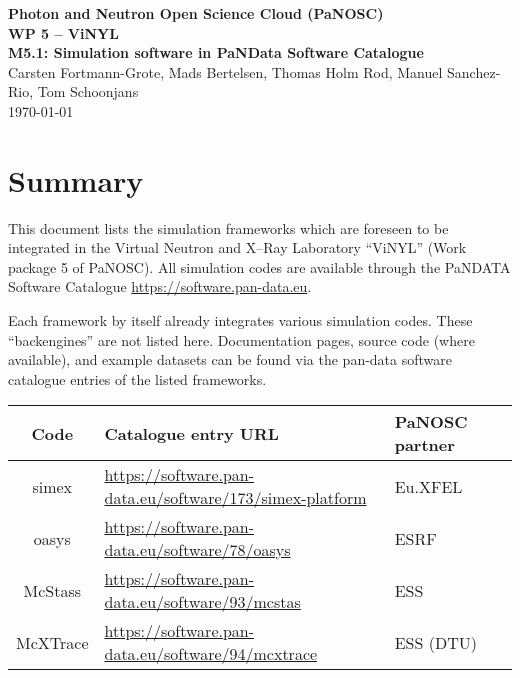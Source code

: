 \documentclass[10pt]{scrartcl}
\begin{document}
\makeatletter
\begin{titlepage}
\thispagestyle{scrheadings}
\begin{center}
  $~$\\
  \vspace{2cm}
  \Huge{%
    \textbf{%
      Photon and Neutron Open Science Cloud (PaNOSC) \\[1cm]
      WP 5 -- ViNYL\\[1cm]
      M5.1: Simulation software in PaNData Software Catalogue
    }
  }\\
  \vspace{2cm}
  \large{%
    Carsten Fortmann-Grote,
    Mads Bertelsen,
    Thomas Holm Rod,
    Manuel Sanchez-Rio,
    Tom Schoonjans
  }\\
  \today
\end{center}
\vfill%
\end{titlepage}
\makeatother


\section{Summary}

This document lists the simulation frameworks which are foreseen to be integrated in
the Virtual Neutron and X--Ray Laboratory ``ViNYL'' (Work package 5 of PaNOSC).
All simulation codes are available through the PaNDATA Software Catalogue
\url{https://software.pan-data.eu}.

Each framework by itself already integrates various simulation codes. These
``backengines'' are not listed here. Documentation pages, source code (where
available), and example datasets can be found via the pan-data software
catalogue entries of the listed frameworks.\\[5ex]
\begin{tabular}{|c|l|l|l|}
  \hline
  \textbf{Code} & \textbf{Catalogue entry URL} & \textbf{PaNOSC partner} \\
  \hline
  simex & \url{https://software.pan-data.eu/software/173/simex-platform} & Eu.XFEL \\
  oasys & \url{https://software.pan-data.eu/software/78/oasys} & ESRF \\
  McStass & \url{https://software.pan-data.eu/software/93/mcstas} & ESS \\
  McXTrace & \url{https://software.pan-data.eu/software/94/mcxtrace} & ESS (DTU) \\
  \hline
\end{tabular}
\end{document}
